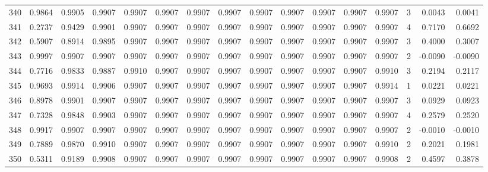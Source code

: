 \begin{tabular}{lrrrrrrrrrrrrrrr}
340 &      0.9864 &  0.9905 &  0.9907 &  0.9907 &  0.9907 &  0.9907 &  0.9907 &  0.9907 &  0.9907 &  0.9907 &   0.9907 &     0.9907 &      3 &                    0.0043 &                     0.0041 \\
341 &      0.2737 &  0.9429 &  0.9901 &  0.9907 &  0.9907 &  0.9907 &  0.9907 &  0.9907 &  0.9907 &  0.9907 &   0.9907 &     0.9907 &      4 &                    0.7170 &                     0.6692 \\
342 &      0.5907 &  0.8914 &  0.9895 &  0.9907 &  0.9907 &  0.9907 &  0.9907 &  0.9907 &  0.9907 &  0.9907 &   0.9907 &     0.9907 &      3 &                    0.4000 &                     0.3007 \\
343 &      0.9997 &  0.9907 &  0.9907 &  0.9907 &  0.9907 &  0.9907 &  0.9907 &  0.9907 &  0.9907 &  0.9907 &   0.9907 &     0.9907 &      2 &                   -0.0090 &                    -0.0090 \\
344 &      0.7716 &  0.9833 &  0.9887 &  0.9910 &  0.9907 &  0.9907 &  0.9907 &  0.9907 &  0.9907 &  0.9907 &   0.9907 &     0.9910 &      3 &                    0.2194 &                     0.2117 \\
345 &      0.9693 &  0.9914 &  0.9906 &  0.9907 &  0.9907 &  0.9907 &  0.9907 &  0.9907 &  0.9907 &  0.9907 &   0.9907 &     0.9914 &      1 &                    0.0221 &                     0.0221 \\
346 &      0.8978 &  0.9901 &  0.9907 &  0.9907 &  0.9907 &  0.9907 &  0.9907 &  0.9907 &  0.9907 &  0.9907 &   0.9907 &     0.9907 &      3 &                    0.0929 &                     0.0923 \\
347 &      0.7328 &  0.9848 &  0.9903 &  0.9907 &  0.9907 &  0.9907 &  0.9907 &  0.9907 &  0.9907 &  0.9907 &   0.9907 &     0.9907 &      4 &                    0.2579 &                     0.2520 \\
348 &      0.9917 &  0.9907 &  0.9907 &  0.9907 &  0.9907 &  0.9907 &  0.9907 &  0.9907 &  0.9907 &  0.9907 &   0.9907 &     0.9907 &      2 &                   -0.0010 &                    -0.0010 \\
349 &      0.7889 &  0.9870 &  0.9910 &  0.9907 &  0.9907 &  0.9907 &  0.9907 &  0.9907 &  0.9907 &  0.9907 &   0.9907 &     0.9910 &      2 &                    0.2021 &                     0.1981 \\
350 &      0.5311 &  0.9189 &  0.9908 &  0.9907 &  0.9907 &  0.9907 &  0.9907 &  0.9907 &  0.9907 &  0.9907 &   0.9907 &     0.9908 &      2 &                    0.4597 &                     0.3878 \\

\end{tabular}
